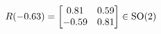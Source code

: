 \documentclass[preview]{standalone}
\begin{document}
\begin{align*}
\special{dvisvgm:raw <g id='unique000'>}R(-0.63) = \begin{bmatrix} 0.81 & 0.59 \\ -0.59 & 0.81 \end{bmatrix} \in \text{SO}(2)\special{dvisvgm:raw </g>}
\end{align*}
\end{document}

